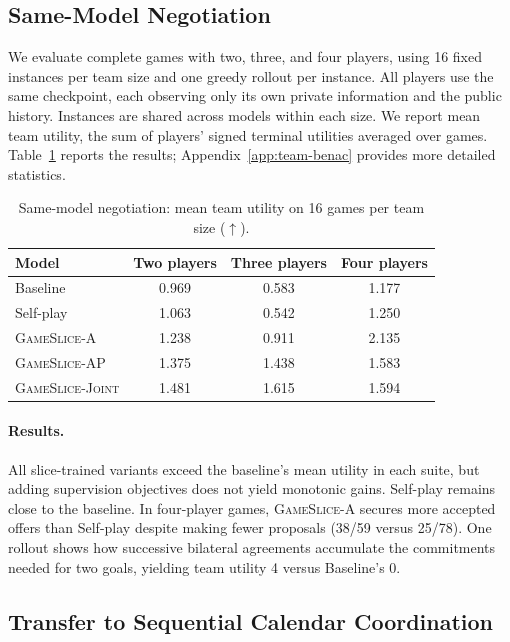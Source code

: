 \subsection{Same-Model Negotiation}
\label{sec:experiment-team}

We evaluate complete games with two, three, and four players, using 16 fixed
instances per team size and one greedy rollout per instance. All players
use the same checkpoint, each observing only its own private information
and the public history. Instances are shared across models within each size.
We report mean team utility, the sum of players' signed terminal utilities
averaged over games.
Table~\ref{tab:experiment-team} reports the results;
Appendix~\ref{app:team-benac} provides more detailed statistics.

\begin{table}[t]
\caption{Same-model negotiation: mean team utility on 16 games per team size
($\uparrow$).}
\label{tab:experiment-team}
\centering\small
\begin{tabular}{lccc}
\hline
Model & Two players & Three players & Four players \\
\hline
Baseline & 0.969 & 0.583 & 1.177 \\
Self-play & 1.063 & 0.542 & 1.250 \\
\textsc{GameSlice-A} & 1.238 & 0.911 & 2.135 \\
\textsc{GameSlice-AP} & 1.375 & 1.438 & 1.583 \\
\textsc{GameSlice-Joint} & 1.481 & 1.615 & 1.594 \\
\hline
\end{tabular}
\end{table}

\paragraph{Results.}
All slice-trained variants exceed the baseline's mean utility in each suite,
but adding supervision objectives does not yield monotonic gains. Self-play
remains close to the baseline. In four-player games, \textsc{GameSlice-A} secures more
accepted offers than Self-play despite making fewer proposals (38/59 versus
25/78). One rollout shows how successive bilateral agreements accumulate
the commitments needed for two goals, yielding team utility 4 versus Baseline's 0.


\subsection{Transfer to Sequential Calendar Coordination}
\label{sec:experiment-transfer}

